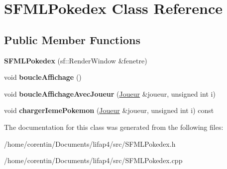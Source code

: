 \hypertarget{class_s_f_m_l_pokedex}{}\section{S\+F\+M\+L\+Pokedex Class Reference}
\label{class_s_f_m_l_pokedex}
\subsection*{Public Member Functions}
\begin{DoxyCompactItemize}
\item 
\mbox{\label{class_s_f_m_l_pokedex_a94d68bf080f6b2503fa8e867663a4b2b}} 
{\bfseries S\+F\+M\+L\+Pokedex} (sf\+::\+Render\+Window \&fenetre)
\item 
\mbox{\label{class_s_f_m_l_pokedex_a7caf472eeb1060d9ce88c7cf3cb4bbb8}} 
void {\bfseries boucle\+Affichage} ()
\item 
\mbox{\label{class_s_f_m_l_pokedex_a0b447d5b74964d395264d6d5e50aadbd}} 
void {\bfseries boucle\+Affichage\+Avec\+Joueur} (\hyperlink{class_joueur}{Joueur} \&joueur, unsigned int i)
\item 
\mbox{\label{class_s_f_m_l_pokedex_af47eb49ddd0c3651f390b45b6697c2d2}} 
void {\bfseries charger\+Ieme\+Pokemon} (\hyperlink{class_joueur}{Joueur} \&joueur, unsigned int i) const
\end{DoxyCompactItemize}


The documentation for this class was generated from the following files\+:\begin{DoxyCompactItemize}
\item 
/home/corentin/\+Documents/lifap4/src/S\+F\+M\+L\+Pokedex.\+h\item 
/home/corentin/\+Documents/lifap4/src/S\+F\+M\+L\+Pokedex.\+cpp\end{DoxyCompactItemize}
